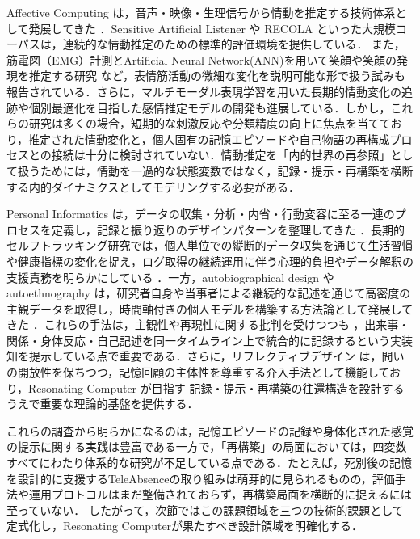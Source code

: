 \documentclass[originalpaper]{jsaiart}
\begin{document}
Affective Computing は，音声・映像・生理信号から情動を推定する技術体系として発展してきた \cite{picard1997,cowie2011}．Sensitive Artificial Listener \cite{douglascowie2008} や RECOLA \cite{ringeval2013} といった大規模コーパス\cite{Lang_2005,Ota_2023}は，連続的な情動推定のための標準的評価環境を提供している．
また，筋電図（EMG）計測とArtificial Neural Network(ANN)を用いて笑顔や笑顔の発現を推定する研究 \cite{suzuki2004emg} など，表情筋活動の微細な変化を説明可能な形で扱う試みも報告されている．さらに，マルチモーダル表現学習を用いた長期的情動変化の追跡や個別最適化を目指した感情推定モデルの開発も進展している．しかし，これらの研究は多くの場合，短期的な刺激反応や分類精度の向上に焦点を当てており，推定された情動変化と，個人固有の記憶エピソードや自己物語の再構成プロセスとの接続は十分に検討されていない．情動推定を「内的世界の再参照」として扱うためには，情動を一過的な状態変数ではなく，記録・提示・再構築を横断する内的ダイナミクスとしてモデリングする必要がある．

Personal Informatics は，データの収集・分析・内省・行動変容に至る一連のプロセスを定義し，記録と振り返りのデザインパターンを整理してきた \cite{li2010,choe2014,epstein2015}．長期的セルフトラッキング研究では，個人単位での縦断的データ収集を通じて生活習慣や健康指標の変化を捉え，ログ取得の継続運用に伴う心理的負担やデータ解釈の支援責務を明らかにしている \cite{karkar2017,quadrana2018}．一方，autobiographical design や autoethnography は，研究者自身や当事者による継続的な記述を通じて高密度の主観データを取得し，時間軸付きの個人モデルを構築する方法論として発展してきた \cite{adams2015,ellis2011,neustaedter2012,suwa2015,kagawa2024}．これらの手法は，主観性や再現性に関する批判を受けつつも \cite{anderson2006,atkinson2006,delamont2009}，出来事・関係・身体反応・自己記述を同一タイムライン上で統合的に記録するという実装知を提示している点で重要である．さらに，リフレクティブデザイン \cite{sengers2005} は，問いの開放性を保ちつつ，記憶回顧の主体性を尊重する介入手法として機能しており，Resonating Computer が目指す 記録・提示・再構築の往還構造を設計するうえで重要な理論的基盤を提供する．

これらの調査から明らかになるのは，記憶エピソードの記録や身体化された感覚の提示に関する実践は豊富である一方で，「再構築」の局面においては，四変数すべてにわたり体系的な研究が不足している点である．たとえば，死別後の記憶を設計的に支援するTeleAbsenceの取り組みは萌芽的に見られるものの，評価手法や運用プロトコルはまだ整備されておらず，再構築局面を横断的に捉えるには至っていない\cite{ishii2025teleabsence}．
したがって，次節ではこの課題領域を三つの技術的課題として定式化し，Resonating Computerが果たすべき設計領域を明確化する．
\end{document}
